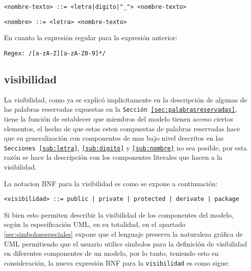 \begin{lstlisting}[basicstyle=\footnotesize\ttfamily, caption={BNF intermedio
definición nombre}]
  <nombre-texto> ::= <letra|digito|"_"> <nombre-texto>
\end{lstlisting}

\begin{lstlisting}[basicstyle=\footnotesize\ttfamily, caption={BNF para un
nombre}]
  <nombre> ::= <letra> <nombre-texto>
\end{lstlisting}

En cuanto la expresión regular para la expresión anterior:

\begin{lstlisting}[basicstyle=\footnotesize\ttfamily, caption={regex para un
nombre}]
	Regex: /[a-zA-Z][a-zA-Z0-9]*/
\end{lstlisting}

\subsection{visibilidad}
\label{sub:visibilidad}
La visibilidad, como ya se explicó implicitamente en la descripción de algunas
de las palabras reservadas expuestas en la \texttt{Sección
\ref{sec:palabrasreservadas}}, tiene la función de establecer que miembros del
modelo tienen acceso ciertos elementos, el hecho de que estas esten compuestas
de palabras reservadas hace que su generalización con componentes de mas bajo
nivel descritos en las \texttt{Secciones \ref{sub:letra}},
\texttt{\ref{sub:digito}} y \texttt{\ref{sub:nombre}} no sea posible, por esta
razón se hace la descripción con los componentes literales que hacen a la
visibilidad.

La notacion BNF para la visibilidad es como se expone a continuación:

\begin{lstlisting}[basicstyle=\footnotesize\ttfamily]
  <visibilidad> ::= public | private | protected | derivate | package
\end{lstlisting}

Si bien esto permiten describir la visibilidad de los componentes del modelo,
según la especificación UML, en su totalidad, en el apartado
\ref{sec:simbolosespeciales} expone que el lenguaje preserva la naturaleza
gráfica de UML permitiendo que el usuario utilice simbolos para la definición
de visibilidad en diferentes componentes de un modelo, por lo tanto, teniendo
esto en consideración, la nueva expresión BNF para la \texttt{visibilidad} es
como sigue:

